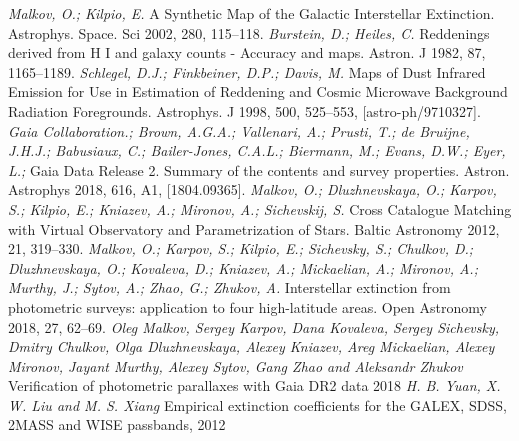 \documentclass[12pt, a4paper]{article}
\begin{document}
\begin{thebibliography}{00}
	\textit{Malkov, O.; Kilpio, E.} A Synthetic Map of the Galactic Interstellar Extinction. Astrophys. Space. Sci 2002, 280, 115–118.
	\textit{Burstein, D.; Heiles, C.} Reddenings derived from H I and galaxy counts - Accuracy and maps. Astron. J 1982, 87, 1165–1189.
	\textit{Schlegel, D.J.; Finkbeiner, D.P.; Davis, M.} Maps of Dust Infrared Emission for Use in Estimation of Reddening and Cosmic Microwave Background Radiation Foregrounds. Astrophys. J 1998, 500, 525–553, [astro-ph/9710327].
	\textit{Gaia Collaboration.; Brown, A.G.A.; Vallenari, A.; Prusti, T.; de Bruijne, J.H.J.; Babusiaux, C.; Bailer-Jones, C.A.L.; Biermann, M.; Evans, D.W.; Eyer, L.; } Gaia Data Release 2. Summary of the contents and survey properties. Astron. Astrophys 2018, 616, A1, [1804.09365].
	\textit{Malkov, O.; Dluzhnevskaya, O.; Karpov, S.; Kilpio, E.; Kniazev, A.; Mironov, A.; Sichevskij, S.} Cross Catalogue Matching with Virtual Observatory and Parametrization of Stars. Baltic Astronomy 2012, 21, 319–330.
	\textit{Malkov, O.; Karpov, S.; Kilpio, E.; Sichevsky, S.; Chulkov, D.; Dluzhnevskaya, O.; Kovaleva, D.; Kniazev, A.; Mickaelian, A.; Mironov, A.; Murthy, J.; Sytov, A.; Zhao, G.; Zhukov, A.} Interstellar extinction from photometric surveys: application to four high-latitude areas. Open Astronomy 2018, 27, 62–69.
	\textit{Oleg Malkov, Sergey Karpov, Dana Kovaleva, Sergey Sichevsky, Dmitry Chulkov, Olga Dluzhnevskaya, Alexey Kniazev, Areg Mickaelian, Alexey Mironov, Jayant Murthy, Alexey Sytov, Gang Zhao and Aleksandr Zhukov} Verification of photometric parallaxes with Gaia DR2 data 2018
	\textit{H. B. Yuan, X. W. Liu and M. S. Xiang} Empirical extinction coefficients for the GALEX, SDSS, 2MASS and WISE passbands, 2012
\end{thebibliography}
\end{document}

